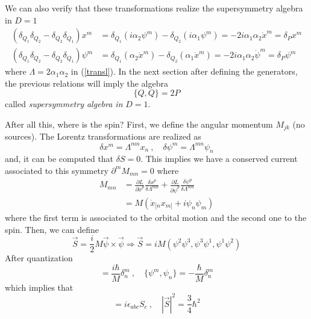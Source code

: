 \documentclass[a4paper,12pt]{article}
\numberwithin{equation}{section}
\numberwithin{exe}{section}
\newcommand{\p}{{\partial}}
\newcommand{\xd}{{\dot x}}
\renewcommand{\a}{{\alpha}}
\renewcommand{\d}{{\delta}}
\newcommand{\e}{{\epsilon}}
\renewcommand{\L}{{\Lambda}}
\begin{document}
We can also verify that these transformations realize the supersymmetry algebra in $D=1$
	\begin{align}
	(\d_{Q_1}\d_{Q_2} - \d_{Q_2}\d_{Q_1})x^m & = \d_{Q_1} (i\a_2 \psi^m) - \d_{Q_2}(i\a_1 \psi^m) = -2 i\a_1\a_2 \xd^m = \d_P x^m \\
	(\d_{Q_1}\d_{Q_2} - \d_{Q_2}\d_{Q_1})\psi^m & = \d_{Q_1}(\a_2\xd^m)-\d_{Q_2}(\a_1\xd^m) = -2i\a_1\a_2\dot\psi^m = \d_P \psi^m
	\end{align}
where $\L = 2\a_1\a_2$ in (\ref{transl}). In the next section after defining the generators, the previous relations will imply the algebra
	\begin{equation}
	\{Q,Q\} = 2P
	\end{equation}
called {\it supersymmetry algebra in} $D=1$.

After all this, where is the spin? First, we define the angular momentum $M_{jk}$ (no sources). The Lorentz transformations are realized as
	\begin{equation}
	\d x^m = \L^{mn} x_n\ ,\quad \d\psi^m = \L^{mn} \psi_n
	\end{equation}
and, it can be computed that $\d S = 0$. This implies we have a conserved current associated to this symmetry $\p^m M_{mn} = 0$ where
	\begin{align}
	M_{mn} & = \frac{\p L}{\p\xd^p}\frac{\d x^p}{\d \L^{mn}} + \frac{\p L}{\p \dot\psi^p}\frac{\d \psi^p}{\d \L^{mn}} \nonumber \\
	& = M ( \xd_{[n} x_{m]} + i\psi_n\psi_m )
	\end{align}
where the first term is associated to the orbital motion and the second one to the spin. Then, we can define
	\begin{equation}
	\vec S = \frac{i}{2} M \vec\psi\times \vec\psi \Rightarrow \vec S = iM(\psi^2\psi^3, \psi^3\psi^1, \psi^1\psi^2)
	\end{equation}
After quantization
	\begin{equation}
	[x^m, \xd_n] = \frac{i\hbar}{M}\d^m_n\ ,\quad \{\psi^m ,\psi_n\} = -\frac{\hbar}{M} \d^m_n
	\end{equation}
which implies that
	\begin{equation}
	[S_a,S_b] = i\e_{abc} S_c \ ,\quad |\vec S|^2 = \frac{3}{4}\hbar^2
	\end{equation}
\end{document}
